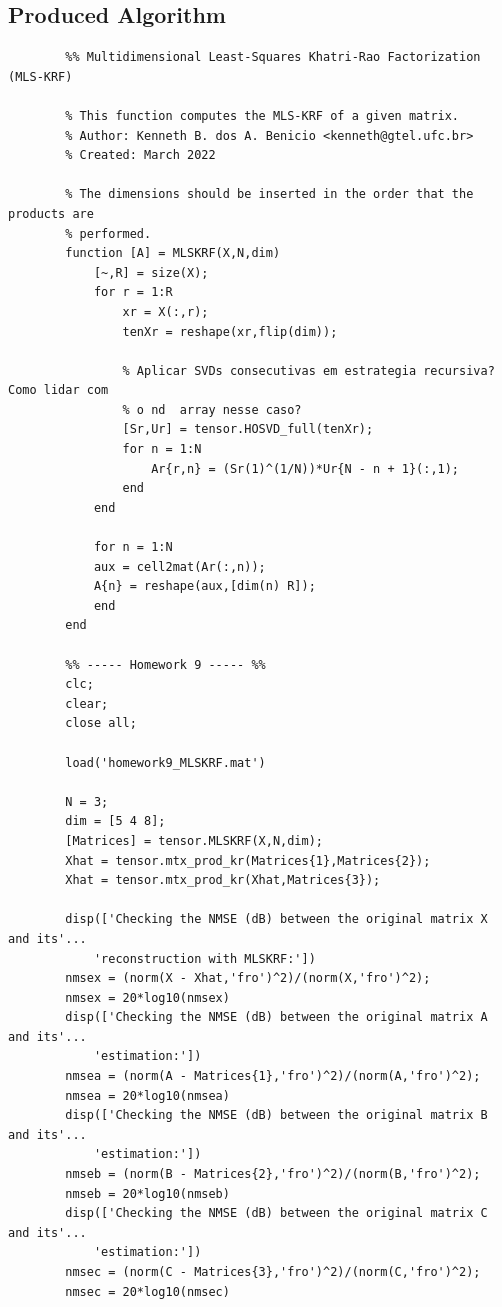 \documentclass[a4paper,10pt]{article}
\begin{document}
    \newpage
    \subsection*{Produced Algorithm}

    \begin{verbatim}
        %% Multidimensional Least-Squares Khatri-Rao Factorization (MLS-KRF)

        % This function computes the MLS-KRF of a given matrix.   
        % Author: Kenneth B. dos A. Benicio <kenneth@gtel.ufc.br>
        % Created: March 2022

        % The dimensions should be inserted in the order that the products are
        % performed.
        function [A] = MLSKRF(X,N,dim)
            [~,R] = size(X); 
            for r = 1:R
                xr = X(:,r);
                tenXr = reshape(xr,flip(dim));
                
                % Aplicar SVDs consecutivas em estrategia recursiva? Como lidar com
                % o nd  array nesse caso?
                [Sr,Ur] = tensor.HOSVD_full(tenXr);
                for n = 1:N
                    Ar{r,n} = (Sr(1)^(1/N))*Ur{N - n + 1}(:,1);
                end
            end
            
            for n = 1:N
            aux = cell2mat(Ar(:,n)); 
            A{n} = reshape(aux,[dim(n) R]);
            end
        end

        %% ----- Homework 9 ----- %%
        clc;
        clear;
        close all;

        load('homework9_MLSKRF.mat')

        N = 3;
        dim = [5 4 8];
        [Matrices] = tensor.MLSKRF(X,N,dim); 
        Xhat = tensor.mtx_prod_kr(Matrices{1},Matrices{2});
        Xhat = tensor.mtx_prod_kr(Xhat,Matrices{3});

        disp(['Checking the NMSE (dB) between the original matrix X and its'...
            'reconstruction with MLSKRF:'])
        nmsex = (norm(X - Xhat,'fro')^2)/(norm(X,'fro')^2);
        nmsex = 20*log10(nmsex)
        disp(['Checking the NMSE (dB) between the original matrix A and its'...
            'estimation:'])
        nmsea = (norm(A - Matrices{1},'fro')^2)/(norm(A,'fro')^2);
        nmsea = 20*log10(nmsea)
        disp(['Checking the NMSE (dB) between the original matrix B and its'...
            'estimation:'])
        nmseb = (norm(B - Matrices{2},'fro')^2)/(norm(B,'fro')^2);
        nmseb = 20*log10(nmseb)
        disp(['Checking the NMSE (dB) between the original matrix C and its'...
            'estimation:'])
        nmsec = (norm(C - Matrices{3},'fro')^2)/(norm(C,'fro')^2);
        nmsec = 20*log10(nmsec)


\end{verbatim}
\end{document}
